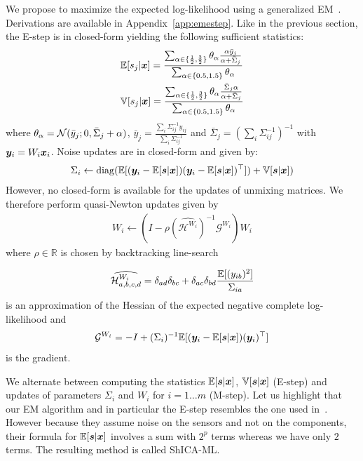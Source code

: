 We propose to maximize the expected log-likelihood using a generalized
EM~\cite{neal1998view, dempster1977maximum}. Derivations are available in Appendix~\ref{app:emestep}. Like in the previous section, the E-step is in closed-form yielding the following sufficient statistics:
  \begin{align}
    \label{mmse2}
    &\mathbb{E}[s_j | \boldsymbol{x}] = \frac{\sum_{\alpha \in \{\frac12, \frac32\}} \theta_{\alpha} \frac{\alpha \bar{y}_{j}}{\alpha + \bar{\Sigma}_{j}}}{\sum_{\alpha \in \{0.5, 1.5\}} \theta_{\alpha}} \\
    & \mathbb{V}[s_j | \boldsymbol{x}] = \frac{\sum_{\alpha \in \{\frac12, \frac32\}} \theta_{\alpha} \frac{\bar{\Sigma}_{j}\alpha}{\alpha + \bar{\Sigma}_{j}}}{\sum_{\alpha \in \{0.5, 1.5\}} \theta_{\alpha}}  
\end{align}
where $\theta_{\alpha} = \mathcal{N}(\bar{y}_{j}; 0 , \bar{\Sigma}_{j} + \alpha)$, 
$\bar{y}_j = \frac{\sum_i \Sigma_{ij}^{-1} y_{ij}}{ \sum_i
  \Sigma_{ij}^{-1}}$ and $\bar{\Sigma}_{j} = (\sum_i
\Sigma_{ij}^{-1})^{-1}$ with $\boldsymbol{y}_i = W_i \boldsymbol{x}_i$.
Noise updates are in closed-form and given by:
\begin{align}
  \Sigma_i \leftarrow  \operatorname*{diag}(\mathbb{E}[(\boldsymbol{y}_i - \mathbb{E}[\boldsymbol{s} | \boldsymbol{x}]) (\boldsymbol{y}_i - \mathbb{E}[\boldsymbol{s} | \boldsymbol{x}])^{\top}])+ \mathbb{V}[\boldsymbol{s} | \boldsymbol{x}])
\end{align}
However, no closed-form is available for the updates of unmixing matrices. We therefore perform quasi-Newton updates given by
\begin{align}
  W_i \leftarrow (I - \rho (\widehat{\mathcal{H}^{W_i}})^{-1} \mathcal{G}^{W_i}) W_i
\end{align}
where $\rho \in \mathbb{R}$ is chosen by backtracking line-search

\begin{align}
	\widehat{\mathcal{H}^{W_i}_{a, b, c, d}} =  \delta_{ad} \delta_{bc} + \delta_{ac} \delta_{bd}\frac{\mathbb{E}[(y_{ib})^2]}{\Sigma_{ia}}
\end{align}
is an approximation of the Hessian of the expected negative complete log-likelihood and
\begin{align}
	\mathcal{G}^{W_i} = -I + (\Sigma_i)^{-1}\mathbb{E}[(\boldsymbol{y}_i - \mathbb{E}[\boldsymbol{s}|\boldsymbol{x}])(\boldsymbol{y}_i)^{\top}]
\end{align}
 is the gradient.

We alternate between computing the statistics $\mathbb{E}[\boldsymbol{s}|\boldsymbol{x}]$, 
$\mathbb{V}[\boldsymbol{s}|\boldsymbol{x}]$ (E-step) and updates of parameters $\Sigma_i$ and $W_i$ for $i=1 \dots m$ (M-step). Let us highlight that our EM algorithm and in particular the E-step resembles the one used in~\cite{moulines1997maximum}. However because they assume noise on the sensors and not on the components, their formula for $\mathbb{E}[\boldsymbol{s}| \boldsymbol{x}]$ involves a sum with $2^p$ terms whereas we have only $2$ terms. The resulting method is called ShICA-ML.

